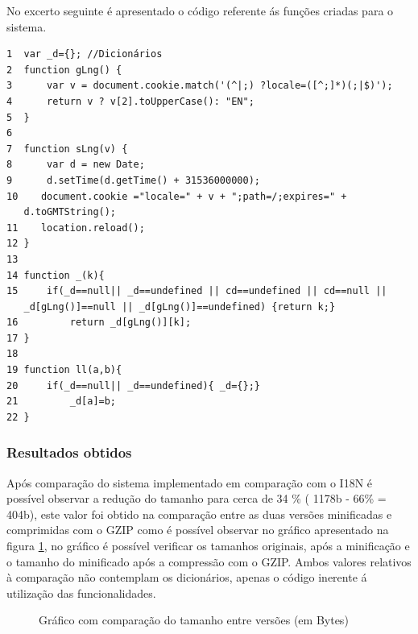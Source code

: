\par No excerto seguinte é apresentado o código referente ás funções criadas para o sistema.
\begin{verbatim}
1  var _d={}; //Dicionários
2  function gLng() {
3      var v = document.cookie.match('(^|;) ?locale=([^;]*)(;|$)');
4      return v ? v[2].toUpperCase(): "EN";
5  }
6
7  function sLng(v) {
8      var d = new Date;
9      d.setTime(d.getTime() + 31536000000);
10    document.cookie ="locale=" + v + ";path=/;expires=" +
   d.toGMTString();
11    location.reload();
12 }
13
14 function _(k){
15     if(_d==null|| _d==undefined || cd==undefined || cd==null ||
   _d[gLng()]==null || _d[gLng()]==undefined) {return k;}
16         return _d[gLng()][k];
17 }
18
19 function ll(a,b){
20     if(_d==null|| _d==undefined){ _d={};}
21         _d[a]=b;
22 }

\end{verbatim}

\subsubsection{Resultados obtidos}
\par Após comparação do sistema implementado em comparação com o I18N\cite{i18n} é possível observar a redução do tamanho para cerca de 34 \% ( 1178b - 66\% = 404b), este valor foi obtido na comparação entre as duas versões minificadas e comprimidas com o GZIP como é possível observar no gráfico apresentado na figura \ref{garph1}, no gráfico é possível verificar os tamanhos originais, após a minificação e o tamanho do minificado após a compressão com o GZIP. Ambos valores relativos à comparação não contemplam os dicionários, apenas o código inerente á utilização das funcionalidades.

\begin{figure}[ht]
\centering
{}

\caption{Gráfico com comparação do tamanho entre versões (em Bytes)}\label{garph1}
\end{figure}

